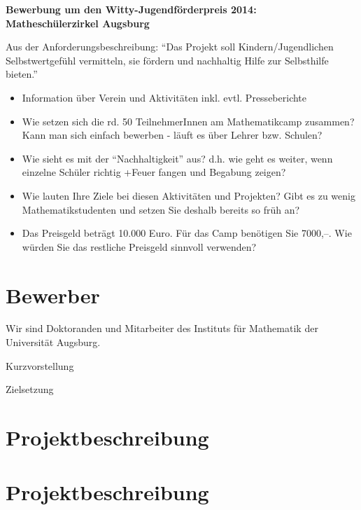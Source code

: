 \documentclass[12pt]{zettel}
\begin{document}
\renewcommand{\betreff}{}

\makeletterhead{}

\vspace{-2em}

\begin{center}
  \Large\textbf{\textsf{Bewerbung um den Witty-Jugendförderpreis 2014: \\
  Matheschülerzirkel Augsburg }}
\end{center}

\doublespacing

Aus der Anforderungsbeschreibung: "`Das Projekt soll
Kindern/Jugendlichen Selbstwertgefühl vermitteln, sie fördern und nachhaltig
Hilfe zur Selbsthilfe bieten."'

\begin{itemize}
\item Information über Verein und Aktivitäten inkl. evtl. Presseberichte
\item Wie setzen sich die rd. 50 TeilnehmerInnen am Mathematikcamp zusammen? Kann
man sich einfach bewerben - läuft es über Lehrer bzw. Schulen?
\item Wie sieht es mit der "`Nachhaltigkeit"' aus? d.h. wie geht es weiter, wenn
einzelne Schüler richtig +Feuer fangen und Begabung zeigen?
\item Wie lauten Ihre Ziele bei diesen Aktivitäten und Projekten? Gibt es zu
wenig Mathematikstudenten und setzen Sie deshalb bereits so früh an?
\item Das Preisgeld beträgt 10.000 Euro. Für das Camp benötigen Sie 7000,--. Wie
würden Sie das restliche Preisgeld sinnvoll verwenden?
\end{itemize}

\section{Bewerber}

Wir sind Doktoranden und Mitarbeiter des Instituts für Mathematik der
Universität Augsburg.

Kurzvorstellung

Zielsetzung


\section{Projektbeschreibung}

\section{Projektbeschreibung}
\end{document}
